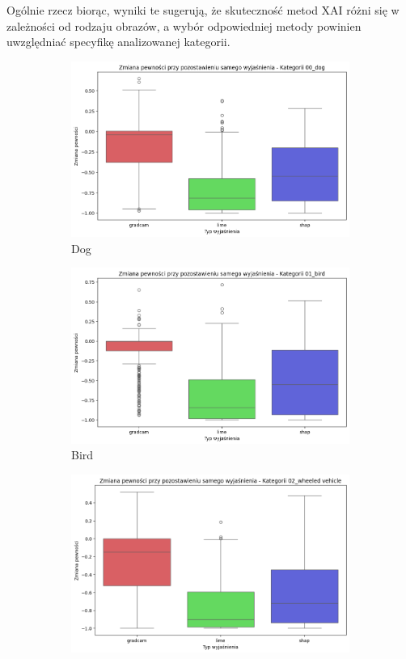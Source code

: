 Ogólnie rzecz biorąc, wyniki te sugerują, że skuteczność metod XAI różni się w zależności od rodzaju obrazów, a wybór odpowiedniej metody powinien uwzględniać specyfikę analizowanej kategorii.

\begin{figure}
	\centering
	\begin{subfigure}[b]{0.3\textwidth}
		\includegraphics[width=.9\textwidth]{img/base_confidence_exp_dog}
		\caption{Dog}  \label{rys:base_confidence_exp_dog}
	\end{subfigure}
	\begin{subfigure}[b]{0.3\textwidth}
		\centering\includegraphics[width=.9\textwidth]{img/base_confidence_exp_bird}
		\caption{Bird}  \label{rys:base_confidence_exp_bird}
	\end{subfigure}
	\begin{subfigure}[b]{0.3\textwidth}
		\centering\includegraphics[width=.9\textwidth]{img/base_confidence_exp_vehicle}

\end{subfigure}
\end{figure}
